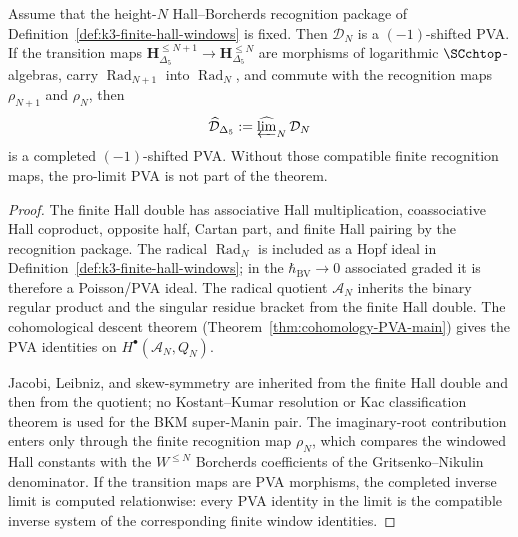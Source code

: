 \begin{proposition}
\label{rem:pvadr-MC-integrability}
\label{prop:pvadr-windowwise-descent}
Assume that the height-$N$ Hall--Borcherds recognition package of
Definition~\ref{def:k3-finite-hall-windows} is fixed.  Then
$\mathcal D_N$ is a $(-1)$-shifted PVA.  If the transition maps
$\mathbf H_{\Delta_5}^{\le N+1}\to\mathbf H_{\Delta_5}^{\le N}$
are morphisms of logarithmic $\SCchtop$-algebras, carry
$\operatorname{Rad}_{N+1}$ into $\operatorname{Rad}_N$, and commute
with the recognition maps $\rho_{N+1}$ and $\rho_N$, then
\[
 \widehat{\mathcal D}_{\Delta_5}
 :=
 \widehat{\varprojlim}_{N}\,\mathcal D_N
\]
is a completed $(-1)$-shifted PVA.  Without those compatible finite
recognition maps, the pro-limit PVA is not part of the theorem.
\end{proposition}

\begin{proof}
The finite Hall double has associative Hall multiplication,
coassociative Hall coproduct, opposite half, Cartan part, and finite
Hall pairing by the recognition package.  The radical
$\operatorname{Rad}_N$ is included as a Hopf ideal in
Definition~\ref{def:k3-finite-hall-windows}; in the
$\hbar_{\mathrm{BV}}\to0$ associated graded it is therefore a
Poisson/PVA ideal.  The radical quotient $\mathcal A_N$ inherits the
binary regular product and the singular residue bracket from the finite
Hall double.  The cohomological descent theorem
(Theorem~\ref{thm:cohomology-PVA-main}) gives the PVA identities on
$H^\bullet(\mathcal A_N,Q_N)$.

Jacobi, Leibniz, and skew-symmetry are inherited from the finite Hall
double and then from the quotient; no Kostant--Kumar resolution or
Kac classification theorem is used for the BKM super-Manin pair.  The
imaginary-root contribution enters only through the finite recognition
map $\rho_N$, which compares the windowed Hall constants with the
$W^{\le N}$ Borcherds coefficients of the Gritsenko--Nikulin
denominator.  If the transition maps are PVA morphisms, the completed
inverse limit is computed relationwise: every PVA identity in the
limit is the compatible inverse system of the corresponding finite
window identities.
\end{proof}

